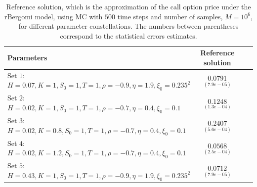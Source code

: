\documentclass[11pt]{article}
\begin{document}
\FloatBarrier
\begin{table}[!h]
	\centering
	\begin{small}
	\begin{tabular}{l*{2}{c}r}
	\toprule[1.5pt]
		Parameters            & Reference solution    \\
		\hline

			Set $1$:	$H=0.07, K=1,S_0=1, T=1, \rho=-0.9, \eta=1.9,\xi_0=0.235^2$   & $\underset{(7.9e-05)}{0.0791}$  \\	
			
				Set $2$:	$H=0.02, K=1, S_0=1, T=1,\rho=-0.7, \eta=0.4,\xi_0=0.1$   & $\underset{(1.3e-04)}{0.1248}$  \\
					Set $3$:	$H=0.02, K=0.8,S_0=1,T=1, \rho=-0.7, \eta=0.4,\xi_0=0.1$   & $\underset{(5.6e-04)}{0.2407}$  \\
						Set $4$:	$H=0.02, K=1.2,S_0=1,T=1, \rho=-0.7, \eta=0.4,\xi_0=0.1$   & $\underset{(2.5e-04)}{0.0568}$  \\
						Set $5$:	$H=0.43, K=1,S_0=1, T=1, \rho=-0.9, \eta=1.9,\xi_0=0.235^2$   & $\underset{(7.9e-05)}{ 0.0712}$  \\	
	\bottomrule[1.25pt]
	\end{tabular}
\end{small}
	\caption{Reference solution, which is the  approximation of the call option price under the rBergomi model,  using MC with $500$ time steps and number of samples, $M=10^6$, for different parameter constellations.  The numbers between parentheses correspond to the statistical errors estimates.}
	\label{table:Reference solution, using MC with $500$ time steps, of Call option price under rBergomi model, for different parameter constellation.}
\end{table}
\FloatBarrier
\end{document}
